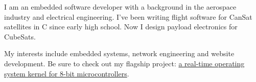 \documentclass[letter,10pt]{article}
\begin{document}
    \begin{justify}
        I am an embedded software developer with a background in the aerospace industry and electrical engineering. I've been writing flight software for CanSat satellites in C since early high school. Now I design payload electronics for CubeSats.
        \setlength{\parskip}{1em}
        \setlength{\parindent}{0em}

        My interests include embedded systems, network engineering and website development. Be sure to check out my flagship project: \href{https://github.com/cansat-ptl/cubesat-rtos}{a real-time operating system kernel for 8-bit microcontrollers}.
    \end{justify}
\end{document}

